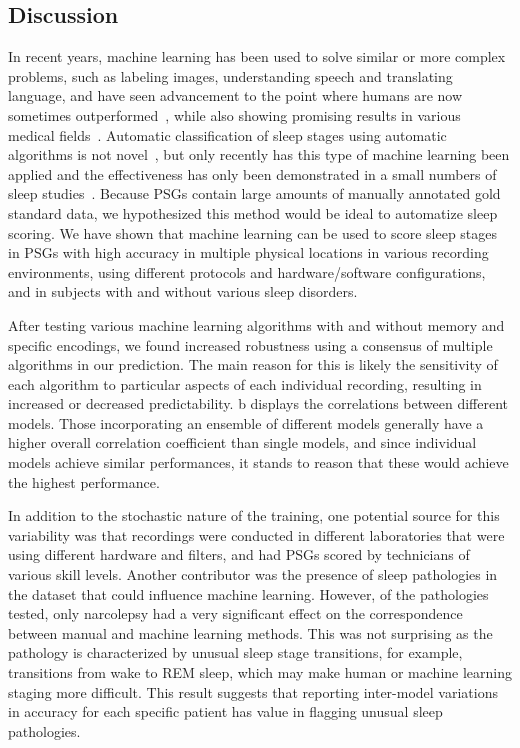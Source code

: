 \subsection{Discussion}
In recent years, machine learning has been used to solve similar or more complex problems, such as labeling images, understanding speech and translating language, and have seen advancement to the point where humans are now sometimes outperformed~\cite{Hinton2012b,He2015a,He2016}, while also showing promising results in various medical fields~\cite{Cheng2016,Gulshan2016,Bejnordi2017,Esteva2017,Lakhani2017,Ting2017}.
Automatic classification of sleep stages using automatic algorithms is not novel~\cite{Anderer2005, Fiorillo2019}, but only recently has this type of machine learning been applied and the effectiveness has only been demonstrated in a small numbers of sleep studies~\cite{Ronzhina2012,Lajnef2015,Olesen2016,Boostani2017,DaSilveira2017}. 
Because \acp{PSG} contain large amounts of manually annotated gold standard data, we hypothesized this method would be ideal to automatize sleep scoring.
We have shown that machine learning can be used to score sleep stages in \acp{PSG} with high accuracy in multiple physical locations in various recording environments, using different protocols and hardware/software configurations, and in subjects with and without various sleep disorders.

After testing various machine learning algorithms with and without memory and specific encodings, we found increased robustness using a consensus of multiple algorithms in our prediction.
The main reason for this is likely the sensitivity of each algorithm to particular aspects of each individual recording, resulting in increased or decreased predictability.
b displays the correlations between different models.
Those incorporating an ensemble of different models generally have a higher overall correlation coefficient than single models, and since individual models achieve similar performances, it stands to reason that these would achieve the highest performance.

In addition to the stochastic nature of the training, one potential source for this variability was that recordings were conducted in different laboratories that were using different hardware and filters, and had \acp{PSG} scored by technicians of various skill levels.
Another contributor was the presence of sleep pathologies in the dataset that could influence machine learning.
However, of the pathologies tested, only narcolepsy had a very significant effect on the correspondence between manual and machine learning methods.
This was not surprising as the pathology is characterized by unusual sleep stage transitions, for example, transitions from wake to \ac{REM} sleep, which may make human or machine learning staging more difficult.
This result suggests that reporting inter-model variations in accuracy for each specific patient has value in flagging unusual sleep pathologies.

